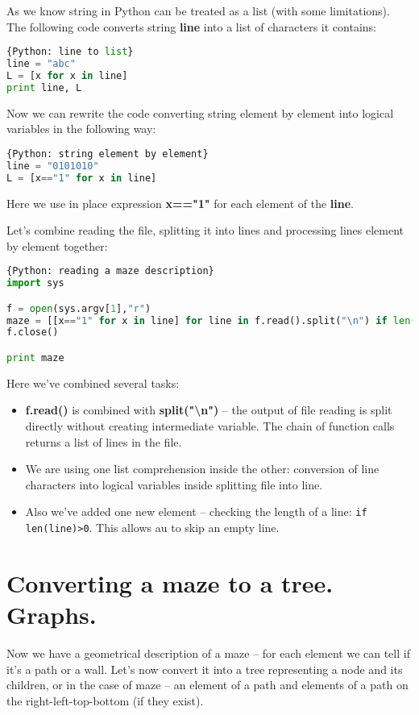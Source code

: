 As we know string in Python can be treated as a list 
(with some limitations).
The following code converts string \textbf{line} into a
list of characters it contains:

\begin{lstlisting}[language=Python,style=codelst]{Python: line to list}
line = "abc"
L = [x for x in line]
print line, L
\end{lstlisting}

Now we can rewrite the code converting string element by element into
logical variables in the following way:

\begin{lstlisting}[language=Python,style=codelst]{Python: string element by element}
line = "0101010"
L = [x=="1" for x in line]
\end{lstlisting}
Here we use in place expression \textbf{x=="1"} 
for each element of the \textbf{line}.

Let's combine reading the file, splitting it into lines and processing lines
element by element together:

\begin{lstlisting}[language=Python,style=codelst]{Python: reading a maze description}
import sys

f = open(sys.argv[1],"r")
maze = [[x=="1" for x in line] for line in f.read().split("\n") if len(line)>0]
f.close()

print maze
\end{lstlisting}
Here we've combined several tasks:
\begin{itemize}
\item \textbf{f.read()} is combined with \textbf{split("\textbackslash n")} -- the output of
file reading is split directly without creating intermediate
variable. The chain of function calls returns a list of lines in the file.
\item We are using one list comprehension inside the other: conversion of
line characters into logical variables inside splitting file into line.
\item Also we've added one new element -- checking the length of a 
line: \lstinline{if len(line)>0}. This allows au to skip an empty line.
\end{itemize}

\section{Converting a maze to a tree. Graphs.}

Now we have a geometrical description
of a maze -- for each element we can tell if it's a path or a wall.
Let's now convert it into a tree representing a node and its children,
or in the case of maze -- an element of a path and
elements of a path on the right-left-top-bottom (if they exist).

